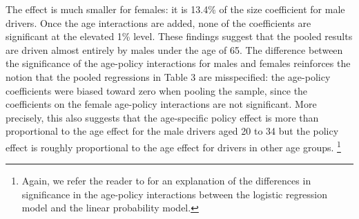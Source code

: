 The effect is much smaller for females: it is 13.4\% of the size coefficient for male drivers. 
Once the age interactions are added, none of the coefficients are significant at the elevated 1\% level. 
These findings suggest that the pooled results are driven almost entirely by males under the age of 65.
%
The difference between the significance of the age-policy interactions for males and females reinforces 
the notion that the pooled regressions in Table 3 are misspecified:
% 
the age-policy coefficients were biased toward zero 
when pooling the sample, 
since the coefficients on the female age-policy interactions are not significant.
%  
More precisely, %
this also 
suggests that the age-specific policy effect is more than proportional to the age effect
for the male drivers aged 20 to 34
but the policy effect is roughly proportional to the age effect
for drivers in other age groups.%
\footnote{%
% 
Again, we refer the reader to \citet{ainorton2003}
for an explanation of the differences in significance in the age-policy interactions between the logistic regression model and the linear probability model. 
}
%

